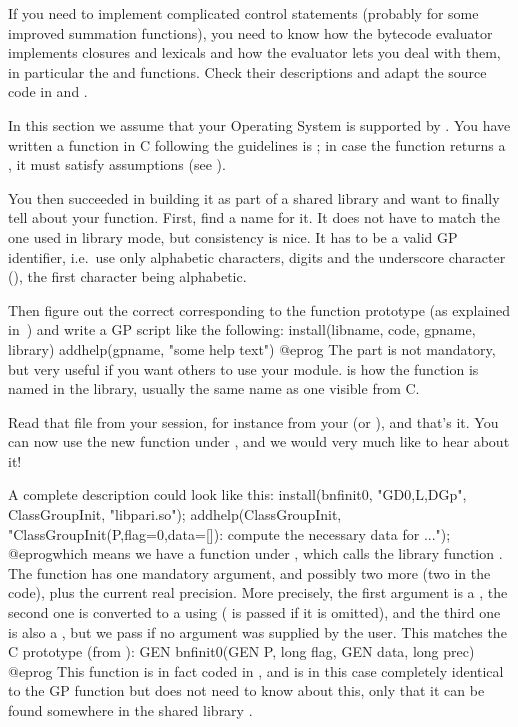  If you need to implement complicated control statements
(probably for some improved summation functions), you need to know
how the bytecode evaluator implements closures and lexicals and how the evaluator lets
you deal with them, in particular the  and 
functions. Check their descriptions and adapt the source code in
 and .


In this section we assume that your Operating System is supported by
. You have written a function in C following the guidelines is
; in case the function returns a , it
must satisfy  assumptions (see ).

You then succeeded in building it as part of a shared library and want to
finally tell  about your function. First, find a name for it. It does
not have to match the one used in library mode, but consistency is nice. It
has to be a valid GP identifier, i.e.~use only alphabetic characters, digits
and the underscore character (\kbd{\_}), the first character being
alphabetic.

Then figure out the correct  corresponding to the function
prototype (as explained in~) and write a GP script
like the following:
\bprog
install(libname, code, gpname, library)
addhelp(gpname, "some help text")
@eprog
\noindent The  part is not mandatory, but very useful if you
want others to use your module.  is how the function is named in
the library, usually the same name as one visible from C.

Read that file from your  session, for instance from your
 (or ), and that's it. You
can now use the new function  under , and we would very
much like to hear about it!
\smallskip

A complete description could look like this:
\bprog
{
  install(bnfinit0, "GD0,L,DGp", ClassGroupInit, "libpari.so");
  addhelp(ClassGroupInit, "ClassGroupInit(P,{flag=0},{data=[]}):
    compute the necessary data for ...");
}
@eprog\noindent which means we have a function  under
, which calls the library function  . The function has
one mandatory argument, and possibly two more (two  in the code),
plus the current real precision. More precisely, the first argument is a
, the second one is converted to a  using 
( is passed if it is omitted), and the third one is also a ,
but we pass  if no argument was supplied by the user. This matches
the C prototype (from ):
%
\bprog
  GEN bnfinit0(GEN P, long flag, GEN data, long prec)
@eprog\noindent
This function is in fact coded in , and is in this case
completely identical to the GP function  but  does not
need to know about this, only that it can be found somewhere in the shared
library .

